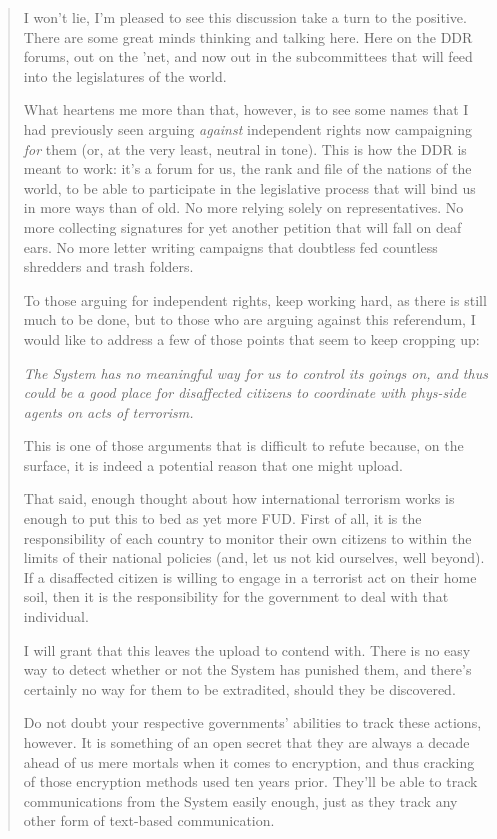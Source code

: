 \begin{quote}
I won't lie, I'm pleased to see this discussion take a turn to the positive. There are some great minds thinking and talking here. Here on the DDR forums, out on the 'net, and now out in the subcommittees that will feed into the legislatures of the world.

What heartens me more than that, however, is to see some names that I had previously seen arguing \emph{against} independent rights now campaigning \emph{for} them (or, at the very least, neutral in tone). This is how the DDR is meant to work: it's a forum for us, the rank and file of the nations of the world, to be able to participate in the legislative process that will bind us in more ways than of old. No more relying solely on representatives. No more collecting signatures for yet another petition that will fall on deaf ears. No more letter writing campaigns that doubtless fed countless shredders and trash folders.

To those arguing for independent rights, keep working hard, as there is still much to be done, but to those who are arguing against this referendum, I would like to address a few of those points that seem to keep cropping up:

\emph{The System has no meaningful way for us to control its goings on, and thus could be a good place for disaffected citizens to coordinate with phys-side agents on acts of terrorism.}

This is one of those arguments that is difficult to refute because, on the surface, it is indeed a potential reason that one might upload.

That said, enough thought about how international terrorism works is enough to put this to bed as yet more FUD. First of all, it is the responsibility of each country to monitor their own citizens to within the limits of their national policies (and, let us not kid ourselves, well beyond). If a disaffected citizen is willing to engage in a terrorist act on their home soil, then it is the responsibility for the government to deal with that individual.

I will grant that this leaves the upload to contend with. There is no easy way to detect whether or not the System has punished them, and there's certainly no way for them to be extradited, should they be discovered.

Do not doubt your respective governments' abilities to track these actions, however. It is something of an open secret that they are always a decade ahead of us mere mortals when it comes to encryption, and thus cracking of those encryption methods used ten years prior. They'll be able to track communications from the System easily enough, just as they track any other form of text-based communication.


\end{quote}

